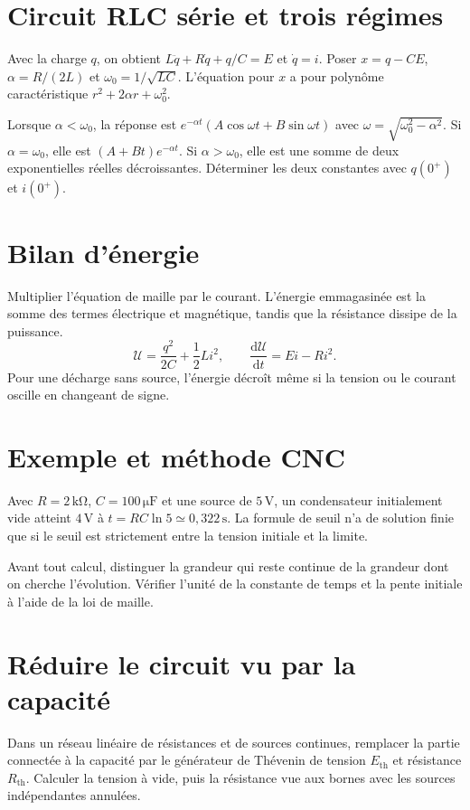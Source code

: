 \documentclass[11pt,a4paper]{article}
\begin{document}
\section*{Circuit RLC série et trois régimes}
Avec la charge $q$, on obtient $L\ddot q+R\dot q+q/C=E$ et $\dot q=i$. Poser $x=q-CE$, $\alpha=R/(2L)$ et $\omega_0=1/\sqrt{LC}$. L’équation pour $x$ a pour polynôme caractéristique $r^2+2\alpha r+\omega_0^2$.

Lorsque $\alpha<\omega_0$, la réponse est $e^{-\alpha t}(A\cos\omega t+B\sin\omega t)$ avec $\omega=\sqrt{\omega_0^2-\alpha^2}$. Si $\alpha=\omega_0$, elle est $(A+Bt)e^{-\alpha t}$. Si $\alpha>\omega_0$, elle est une somme de deux exponentielles réelles décroissantes. Déterminer les deux constantes avec $q(0^+)$ et $i(0^+)$.

\section*{Bilan d’énergie}
Multiplier l’équation de maille par le courant. L’énergie emmagasinée est la somme des termes électrique et magnétique, tandis que la résistance dissipe de la puissance.
\[ \mathcal U=\frac{q^2}{2C}+\frac12Li^2,\qquad \frac{\mathrm d\mathcal U}{\mathrm dt}=Ei-Ri^2. \]
Pour une décharge sans source, l’énergie décroît même si la tension ou le courant oscille en changeant de signe.

\section*{Exemple et méthode CNC}
Avec $R=2\,\mathrm{k\Omega}$, $C=100\,\mathrm{\mu F}$ et une source de $5\,\mathrm V$, un condensateur initialement vide atteint $4\,\mathrm V$ à $t=RC\ln 5\simeq0{,}322\,\mathrm s$. La formule de seuil n’a de solution finie que si le seuil est strictement entre la tension initiale et la limite.

Avant tout calcul, distinguer la grandeur qui reste continue de la grandeur dont on cherche l’évolution. Vérifier l’unité de la constante de temps et la pente initiale à l’aide de la loi de maille.

\section*{Réduire le circuit vu par la capacité}
Dans un réseau linéaire de résistances et de sources continues, remplacer la partie connectée à la capacité par le générateur de Thévenin de tension $E_{\mathrm{th}}$ et résistance $R_{\mathrm{th}}$. Calculer la tension à vide, puis la résistance vue aux bornes avec les sources indépendantes annulées.
\end{document}
